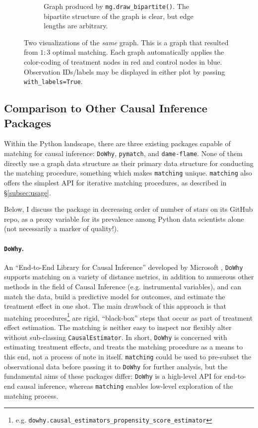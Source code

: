 \documentclass[11pt]{extarticle}
\begin{document}
\begin{figure}[h!]
\begin{subfigure}[t]{0.5\textwidth}
        \caption{Graph produced by \texttt{mg.draw\_bipartite()}. The bipartite structure of the graph is clear, but edge lengths are arbitrary.}
    \end{subfigure}
    \caption{Two visualizations of the \emph{same} graph. This is a graph that resulted from $1:3$ optimal matching. Each graph automatically applies the color-coding of treatment nodes in {\color{red}red} and control nodes in {\color{blue} blue}. Observation IDs/labels may be displayed in either plot by passing \texttt{with\_labels=True}.}
    \label{fig:draw_examples}
\end{figure}


\subsection{Comparison to Other Causal Inference Packages}

Within the Python landscape, there are three existing packages capable of matching for causal inference: \texttt{DoWhy}, \texttt{pymatch}, and \texttt{dame-flame}.
None of them directly use a graph data structure as their primary data structure for conducting the matching procedure, something which makes \texttt{matching} unique. \texttt{matching} also offers the simplest API for iterative matching procedures, as described in \S\ref{subsec:usage}.

Below, I discuss the package in decreasing order of number of stars on its GitHub repo, as a proxy variable for its prevalence among Python data scientists alone (not necessarily a marker of quality!).

\paragraph{\texttt{DoWhy}.} An ``End-to-End Library for Causal Inference'' developed by Microsoft \parencite{dowhypaper}, \texttt{DoWhy} supports matching on a variety of distance metrics, in addition to numerous other methods in the field of Causal Inference (e.g. instrumental variables), and can match the data, build a predictive model for outcomes, and estimate the treatment effect in one shot.
The main drawback of this approach is that matching procedures\footnote{e.g. \texttt{dowhy.causal\_estimators\_propensity\_score\_estimator}} are rigid, ``black-box'' steps that occur as part of treatment effect estimation.
The matching is neither easy to inspect nor flexibly alter without sub-classing \texttt{CausalEstimator}. In short, \texttt{DoWhy} is concerned with estimating treatment effects, and treats the matching procedure as a means to this end, not a process of note in itself. \texttt{matching} could be used to pre-subset the observational data before passing it to \texttt{DoWhy} for further analysis, but the fundamental aims of these packages differ: \texttt{DoWhy} is a high-level API for end-to-end causal inference, whereas \texttt{matching} enables low-level exploration of the matching process.
\end{document}
